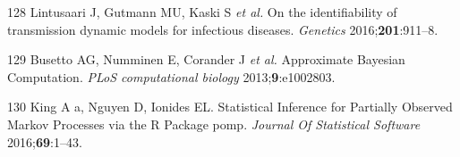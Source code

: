 \documentclass[11pt,twoside]{bristolthesis}
\begin{document}
  \leavevmode\hypertarget{ref-Lintusaari2016}{}%
  128 Lintusaari J, Gutmann MU, Kaski S \emph{et al.} On the identifiability of transmission dynamic models for infectious diseases. \emph{Genetics} 2016;\textbf{201}:911--8.
  
  \leavevmode\hypertarget{ref-Busetto2013}{}%
  129 Busetto AG, Numminen E, Corander J \emph{et al.} Approximate Bayesian Computation. \emph{PLoS computational biology} 2013;\textbf{9}:e1002803.
  
  \leavevmode\hypertarget{ref-King2016}{}%
  130 King A a, Nguyen D, Ionides EL. Statistical Inference for Partially Observed Markov Processes via the R Package pomp. \emph{Journal Of Statistical Software} 2016;\textbf{69}:1--43.


\end{document}
